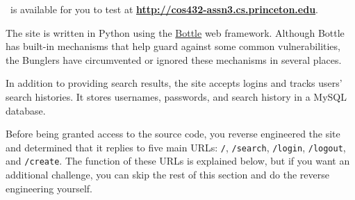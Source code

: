 \documentclass[letterpaper,12pt]{report}
\newcommand{\bungledomain}{http://cos432-assn3.cs.princeton.edu}
\begin{document}
\medskip

\bungle\ is available for you to test at \textbf{\url{\bungledomain}}.

\medskip

The site is written in Python using the \href{http://bottlepy.org/docs/dev/index.html}{Bottle} web framework. Although Bottle has built-in mechanisms that help guard against some common vulnerabilities, the Bunglers have circumvented or ignored these mechanisms in several places.

\medskip

In addition to providing search results, the site accepts logins and tracks users' search histories. It stores usernames, passwords, and search history in a MySQL database.

\medskip

Before being granted access to the source code, you reverse engineered the site and determined that it replies to five main URLs: \texttt{/}, \texttt{/search}, \texttt{/login}, \texttt{/logout}, and \texttt{/create}.  The function of these URLs is explained below, but if you want an additional challenge, you can skip the rest of this section and do the reverse engineering yourself.
\end{document}
